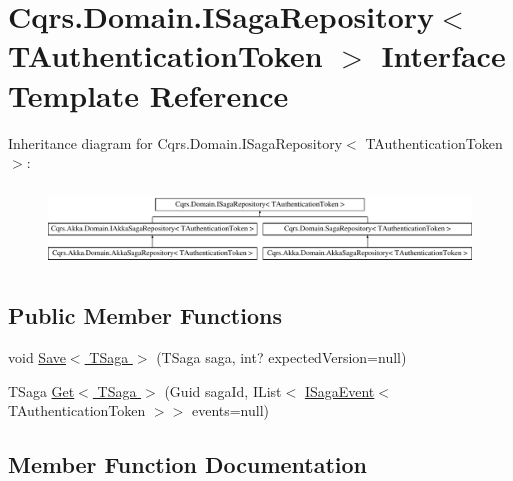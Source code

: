 \hypertarget{interfaceCqrs_1_1Domain_1_1ISagaRepository}{}\section{Cqrs.\+Domain.\+I\+Saga\+Repository$<$ T\+Authentication\+Token $>$ Interface Template Reference}
\label{interfaceCqrs_1_1Domain_1_1ISagaRepository}
Inheritance diagram for Cqrs.\+Domain.\+I\+Saga\+Repository$<$ T\+Authentication\+Token $>$\+:\begin{figure}[H]
\begin{center}
\leavevmode
\includegraphics[height=2.137405cm]{interfaceCqrs_1_1Domain_1_1ISagaRepository}
\end{center}
\end{figure}
\subsection*{Public Member Functions}
\begin{DoxyCompactItemize}
\item 
void \hyperlink{interfaceCqrs_1_1Domain_1_1ISagaRepository_ad539cdc70f3168d0335c9510742e25cd}{Save$<$ T\+Saga $>$} (T\+Saga saga, int? expected\+Version=null)
\item 
T\+Saga \hyperlink{interfaceCqrs_1_1Domain_1_1ISagaRepository_aa3409bf59bbe489afcc89716928e9ad1}{Get$<$ T\+Saga $>$} (Guid saga\+Id, I\+List$<$ \hyperlink{interfaceCqrs_1_1Events_1_1ISagaEvent}{I\+Saga\+Event}$<$ T\+Authentication\+Token $>$$>$ events=null)
\end{DoxyCompactItemize}


\subsection{Member Function Documentation}
\mbox{\label{interfaceCqrs_1_1Domain_1_1ISagaRepository_aa3409bf59bbe489afcc89716928e9ad1}} 
